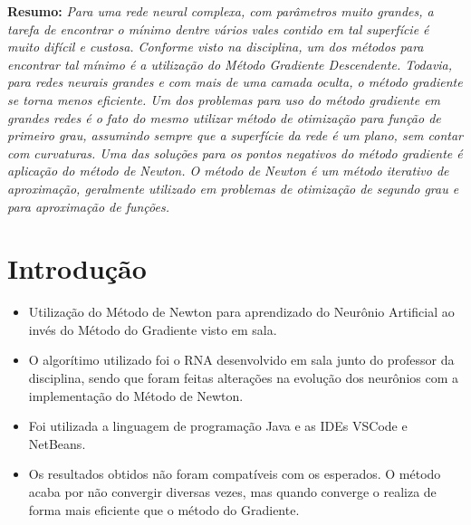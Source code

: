 \documentclass[12pt]{article}
\begin{document}
\noindent\textbf{Resumo:} \textit{Para uma rede neural complexa, com parâmetros muito grandes, a tarefa de encontrar o mínimo dentre vários vales contido em tal superfície é muito difícil e custosa. 
Conforme visto na disciplina, um dos métodos para encontrar tal mínimo é a utilização do Método Gradiente Descendente. Todavia, para redes neurais grandes e com mais de uma camada oculta, o método gradiente se torna menos eficiente.
Um dos problemas para uso do método gradiente em grandes redes é o fato do mesmo utilizar método de otimização para função de primeiro grau, assumindo sempre que a superfície da rede é um plano, sem contar com curvaturas. Uma das soluções para os pontos negativos do método gradiente é aplicação do método de Newton. 
O método de Newton é um método iterativo de aproximação, geralmente utilizado em problemas de otimização de segundo grau e para aproximação de funções.} 

\section{Introdução} 

\begin{itemize}
    \item Utilização do Método de Newton para aprendizado do Neurônio Artificial ao invés do Método do Gradiente visto em sala.
    \item O algorítimo utilizado foi o RNA desenvolvido em sala junto do professor da disciplina, sendo que foram feitas alterações na evolução dos neurônios com a implementação do Método de Newton.
    \item Foi utilizada a linguagem de programação Java e as IDEs VSCode e NetBeans.
    \item Os resultados obtidos não foram compatíveis com os esperados. O método acaba por não convergir diversas vezes, mas quando converge o realiza de forma mais eficiente que o método do Gradiente.
\end{itemize}
\end{document}
